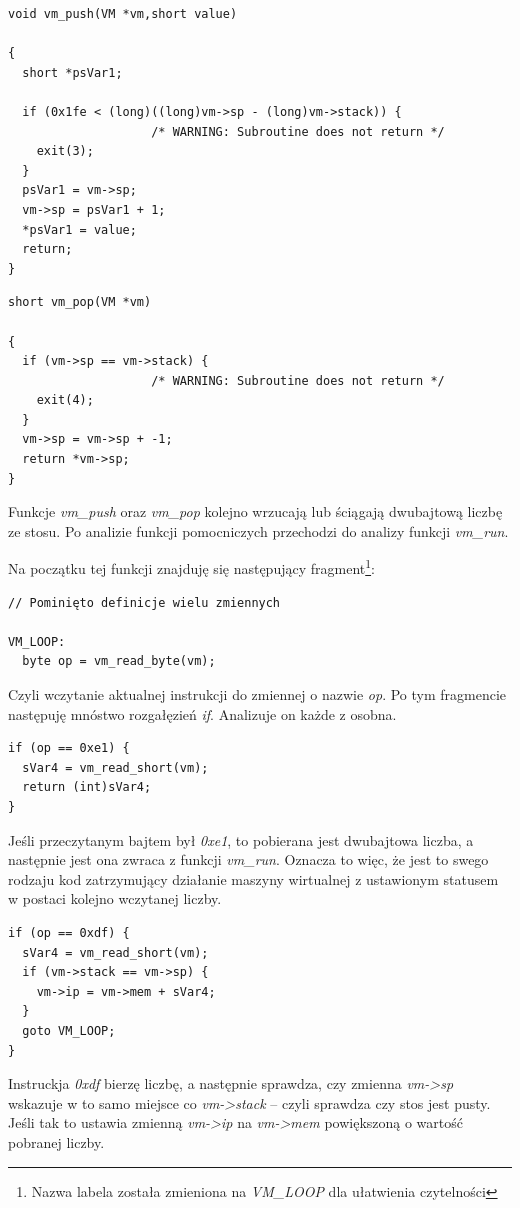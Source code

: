 \documentclass[language=polish,type=eng]{aghmodern}
\begin{document}
\begin{verbatim}
void vm_push(VM *vm,short value)

{
  short *psVar1;
  
  if (0x1fe < (long)((long)vm->sp - (long)vm->stack)) {
                    /* WARNING: Subroutine does not return */
    exit(3);
  }
  psVar1 = vm->sp;
  vm->sp = psVar1 + 1;
  *psVar1 = value;
  return;
}
\end{verbatim}

\begin{verbatim}
short vm_pop(VM *vm)

{
  if (vm->sp == vm->stack) {
                    /* WARNING: Subroutine does not return */
    exit(4);
  }
  vm->sp = vm->sp + -1;
  return *vm->sp;
}
\end{verbatim}

Funkcje \emph{vm\_push} oraz \emph{vm\_pop} kolejno wrzucają lub ściągają dwubajtową
liczbę ze stosu. Po analizie funkcji pomocniczych przechodzi do analizy funkcji
\emph{vm\_run}.

Na początku tej funkcji znajduję się następujący fragment\footnote{Nazwa labela została
zmieniona na \emph{VM\_LOOP} dla ułatwienia czytelności}:

\begin{verbatim}
// Pominięto definicje wielu zmiennych

VM_LOOP:
  byte op = vm_read_byte(vm);
\end{verbatim}

Czyli wczytanie aktualnej instrukcji do zmiennej o nazwie \emph{op}. Po tym fragmencie
następuję mnóstwo rozgałęzień \emph{if}. Analizuje on każde z osobna.

\begin{verbatim}
if (op == 0xe1) {
  sVar4 = vm_read_short(vm);
  return (int)sVar4;
}
\end{verbatim}

Jeśli przeczytanym bajtem był \emph{0xe1}, to pobierana jest dwubajtowa liczba, a następnie
jest ona zwraca z funkcji \emph{vm\_run}. Oznacza to więc, że jest to swego rodzaju kod
zatrzymujący działanie maszyny wirtualnej z ustawionym statusem w postaci kolejno
wczytanej liczby.

\begin{verbatim}
if (op == 0xdf) {
  sVar4 = vm_read_short(vm);
  if (vm->stack == vm->sp) {
    vm->ip = vm->mem + sVar4;
  }
  goto VM_LOOP;
}
\end{verbatim}

Instruckja \emph{0xdf} bierzę liczbę, a następnie sprawdza, czy zmienna \emph{vm->sp} wskazuje
w to samo miejsce co \emph{vm->stack} -- czyli sprawdza czy stos jest pusty. Jeśli tak
to ustawia zmienną \emph{vm->ip} na \emph{vm->mem} powiększoną o wartość pobranej liczby.
\end{document}
